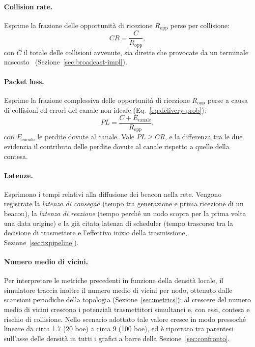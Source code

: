 \paragraph{Collision rate.} Esprime la frazione delle opportunit\`a di
ricezione $R_{\text{opp}}$ perse per collisione:
\begin{equation}
  CR = \frac{C}{R_{\text{opp}}},
  \label{eq:collrate}
\end{equation}
con $C$ il totale delle collisioni avvenute, sia dirette che provocate da un terminale nascosto~\cite{tobagi-hidden} (Sezione~\ref{sec:broadcast-impl}).

\paragraph{Packet loss.} Esprime la frazione complessiva delle opportunit\`a
di ricezione $R_{\text{opp}}$ perse a causa di collisioni ed errori del canale non ideale (Eq.~\ref{eq:delivery-prob}):
\begin{equation}
  PL = \frac{C + E_{\text{canale}}}{R_{\text{opp}}},
  \label{eq:packetloss}
\end{equation}
con $E_{\text{canale}}$ le perdite dovute al canale. Vale $PL \ge CR$, e la
differenza tra le due evidenzia il contributo delle perdite dovute al canale
rispetto a quelle della contesa.

\paragraph{Latenze.} Esprimono i tempi relativi alla diffusione dei
beacon nella rete. Vengono registrate la \emph{latenza di consegna} (tempo tra
generazione e prima ricezione di un beacon), la \emph{latenza di reazione}
(tempo perch\'e un nodo scopra per la prima volta una data origine) e la
gi\`a citata latenza di scheduler (tempo trascorso tra la decisione di trasmettere e l'effettivo inizio della trasmissione, Sezione~\ref{sec:txpipeline}).

\paragraph{Numero medio di vicini.} Per interpretare le metriche precedenti in
funzione della densit\`a locale, il simulatore traccia inoltre il numero medio
di vicini per nodo, ottenuto dalle scansioni periodiche della topologia
(Sezione~\ref{sec:metrics}): al crescere del numero medio di vicini crescono i
potenziali trasmettitori simultanei e, con essi, contesa e rischio di
collisione. Nello scenario adottato tale valore cresce in modo pressoch\'e
lineare da circa 1.7 (20 boe) a circa 9 (100 boe), ed \`e riportato tra
parentesi sull'asse delle densit\`a in tutti i grafici a barre della
Sezione~\ref{sec:confronto}.

